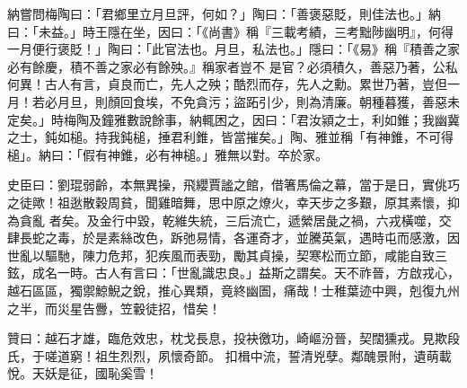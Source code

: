 \begin{pinyinscope}
 納嘗問梅陶曰：「君鄉里立月旦評，何如？」陶曰：「善褒惡貶，則佳法也。」納曰：「未益。」時王隱在坐，因曰：「《尚書》稱『三載考績，三考黜陟幽明』，何得一月便行褒貶！」陶曰：「此官法也。月旦，私法也。」隱曰：「《易》稱『積善之家必有餘慶，積不善之家必有餘殃。』稱家者豈不
 是官？必須積久，善惡乃著，公私何異！古人有言，貞良而亡，先人之殃；酷烈而存，先人之勳。累世乃著，豈但一月！若必月旦，則顏回食埃，不免貪污；盜跖引少，則為清廉。朝種暮獲，善惡未定矣。」時梅陶及鐘雅數說餘事，納輒困之，因曰：「君汝潁之士，利如錐；我幽冀之士，鈍如槌。持我鈍槌，捶君利錐，皆當摧矣。」陶、雅並稱「有神錐，不可得槌」。納曰：「假有神錐，必有神槌。」雅無以對。卒於家。



 史臣曰：劉琨弱齡，本無異操，飛纓賈謐之館，借箸馬倫之幕，當于是日，實佻巧之徒歟！祖逖散穀周貧，聞雞暗舞，思中原之燎火，幸天步之多艱，原其素懷，抑為貪亂
 者矣。及金行中毀，乾維失統，三后流亡，遞縈居彘之禍，六戎橫噬，交肆長蛇之毒，於是素絲改色，跅弛易情，各運奇才，並騰英氣，遇時屯而感激，因世亂以驅馳，陳力危邦，犯疾風而表勁，勵其貞操，契寒松而立節，咸能自致三鉉，成名一時。古人有言曰：「世亂識忠良。」益斯之謂矣。天不祚晉，方啟戎心，越石區區，獨禦鯨鯢之銳，推心異類，竟終幽圄，痛哉！士稚葉迹中興，剋復九州之半，而災星告釁，笠轂徒招，惜矣！



 贊曰：越石才雄，臨危效忠，枕戈長息，投袂徼功，崎嶇汾晉，契闊獯戎。見欺段氏，于嗟道窮！祖生烈烈，夙懷奇節。
 扣楫中流，誓清兇孽。鄰醜景附，遺萌載悅。天妖是征，國恥奚雪！



\end{pinyinscope}